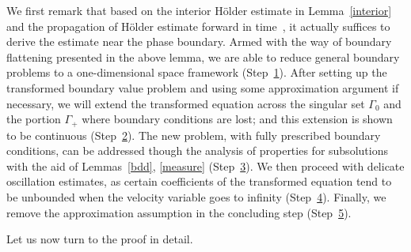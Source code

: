 \documentclass[AHL,Unicode,longabstracts,published]{cedram}
\begin{document}
We first remark that based on the interior H\"older estimate in Lemma~\ref{interior} and the propagation of H\"older estimate forward in time~\cite[Corollary~4.6]{YZ}, it actually suffices to derive the estimate near the phase boundary. Armed with the way of boundary flattening presented in the above lemma, we are able to reduce general boundary problems to a one-dimensional space framework (Step~\hyperref[step1]{1}). After setting up the transformed boundary value problem and using some approximation argument if necessary, we will extend the transformed equation across the singular set $\Gamma_0$ and the portion $\Gamma_+$ where boundary conditions are lost; and this extension is shown to be continuous (Step~\hyperref[step2]{2}). The new problem, with fully prescribed boundary conditions, can be addressed though the analysis of properties for subsolutions with the aid of Lemmas~\ref{bdd}, \ref{measure} (Step~\hyperref[step3]{3}). We then proceed with delicate oscillation estimates, as certain coefficients of the transformed equation tend to be unbounded when the velocity variable goes to infinity (Step~\hyperref[step4]{4}). Finally, we remove the approximation assumption in the concluding step (Step~\hyperref[step5]{5}).

Let us now turn to the proof in detail.
\end{document}
